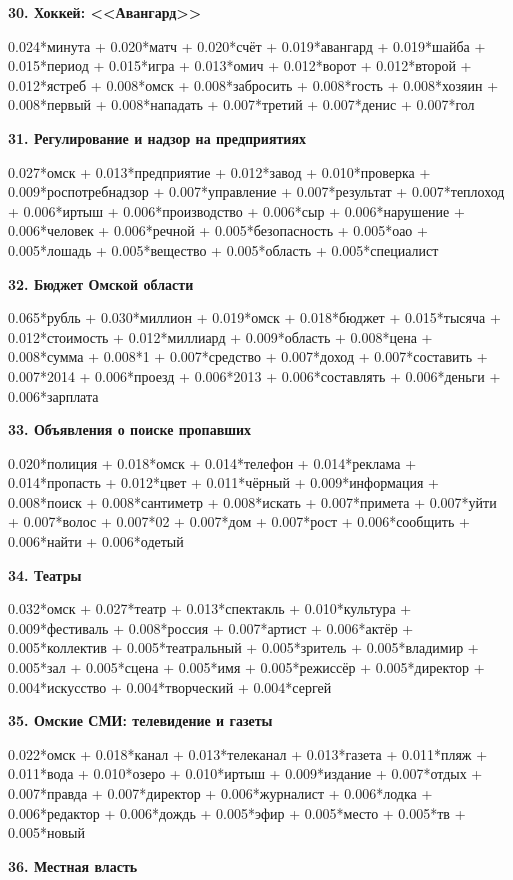 \textbf{30. Хоккей: <<Авангард>>}

0.024*минута + 0.020*матч + 0.020*счёт + 0.019*авангард + 0.019*шайба + 0.015*период + 0.015*игра + 0.013*омич + 0.012*ворот + 0.012*второй + 0.012*ястреб + 0.008*омск + 0.008*забросить + 0.008*гость + 0.008*хозяин + 0.008*первый + 0.008*нападать + 0.007*третий + 0.007*денис + 0.007*гол

\textbf{31. Регулирование и надзор на предприятиях}

0.027*омск + 0.013*предприятие + 0.012*завод + 0.010*проверка + 0.009*роспотребнадзор + 0.007*управление + 0.007*результат + 0.007*теплоход + 0.006*иртыш + 0.006*производство + 0.006*сыр + 0.006*нарушение + 0.006*человек + 0.006*речной + 0.005*безопасность + 0.005*оао + 0.005*лошадь + 0.005*вещество + 0.005*область + 0.005*специалист

\textbf{32. Бюджет Омской области}

0.065*рубль + 0.030*миллион + 0.019*омск + 0.018*бюджет + 0.015*тысяча + 0.012*стоимость + 0.012*миллиард + 0.009*область + 0.008*цена + 0.008*сумма + 0.008*1 + 0.007*средство + 0.007*доход + 0.007*составить + 0.007*2014 + 0.006*проезд + 0.006*2013 + 0.006*составлять + 0.006*деньги + 0.006*зарплата

\textbf{33. Объявления о поиске пропавших}

0.020*полиция + 0.018*омск + 0.014*телефон + 0.014*реклама + 0.014*пропасть + 0.012*цвет + 0.011*чёрный + 0.009*информация + 0.008*поиск + 0.008*сантиметр + 0.008*искать + 0.007*примета + 0.007*уйти + 0.007*волос + 0.007*02 + 0.007*дом + 0.007*рост + 0.006*сообщить + 0.006*найти + 0.006*одетый

\textbf{34. Театры}

0.032*омск + 0.027*театр + 0.013*спектакль + 0.010*культура + 0.009*фестиваль + 0.008*россия + 0.007*артист + 0.006*актёр + 0.005*коллектив + 0.005*театральный + 0.005*зритель + 0.005*владимир + 0.005*зал + 0.005*сцена + 0.005*имя + 0.005*режиссёр + 0.005*директор + 0.004*искусство + 0.004*творческий + 0.004*сергей

\textbf{35. Омские СМИ: телевидение и газеты}

0.022*омск + 0.018*канал + 0.013*телеканал + 0.013*газета + 0.011*пляж + 0.011*вода + 0.010*озеро + 0.010*иртыш + 0.009*издание + 0.007*отдых + 0.007*правда + 0.007*директор + 0.006*журналист + 0.006*лодка + 0.006*редактор + 0.006*дождь + 0.005*эфир + 0.005*место + 0.005*тв + 0.005*новый

\textbf{36. Местная власть}

